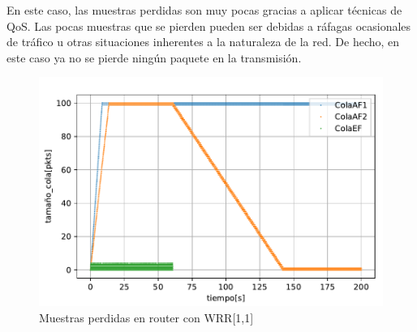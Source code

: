 En este caso, las muestras perdidas son muy pocas gracias a aplicar técnicas de QoS. Las pocas muestras
que se pierden pueden ser debidas a ráfagas ocasionales de tráfico u otras situaciones inherentes a la naturaleza de la red.
De hecho, en este caso ya no se pierde ningún paquete en la transmisión.

\begin{figure}[!ht]
    \centering
    \includegraphics{graficas/WRR/tamao_cola_wrr.pdf}
    \caption{Muestras perdidas en router con WRR[1,1]}
    \label{fig:wrr16_lostsamples}
\end{figure}